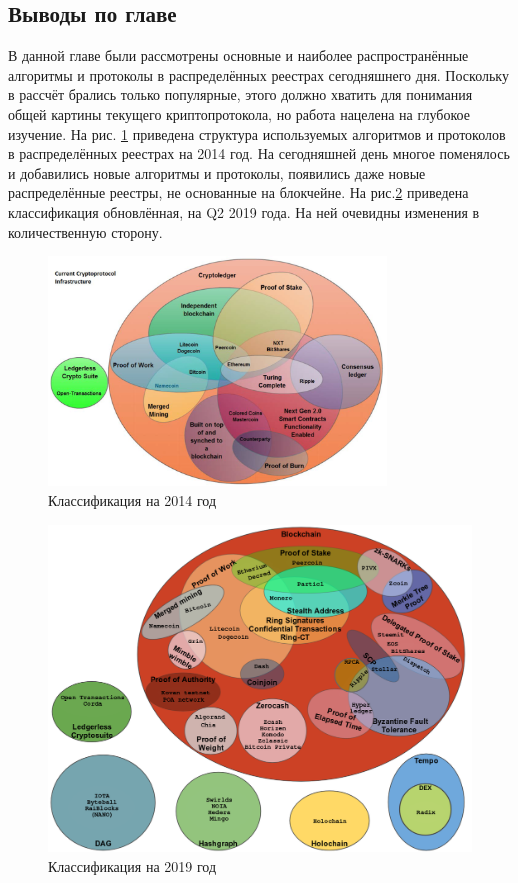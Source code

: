 \subsection{Выводы по главе}
В данной главе были рассмотрены основные и наиболее распространённые алгоритмы
и протоколы в распределённых реестрах сегодняшнего дня. Поскольку в рассчёт
брались только популярные, этого должно хватить для понимания общей картины
текущего криптопротокола, но работа нацелена на глубокое изучение. На рис.
\ref{2014protocol} \cite{TimSwanson2014} приведена структура используемых
алгоритмов и протоколов в распределённых реестрах на 2014 год. На сегодняшней
день многое поменялось и добавились новые алгоритмы и протоколы, появились даже
новые распределённые реестры, не основанные на блокчейне. На
рис.\ref{myprotocol} приведена классификация обновлённая, на Q2 2019 года. На
ней очевидны изменения в количественную сторону.

\newpage
\begin{figure}[h!]
    \centering
    \includegraphics[width=0.8\textwidth]{./images/current_protocols}
    \caption{Классификация на 2014 год}\label{2014protocol}
\end{figure}


\begin{figure}[h!]
    \centering
    \includegraphics[width=.8\textwidth]{./images/myprotocol}
    \caption{Классификация на 2019 год}\label{myprotocol}
\end{figure}
